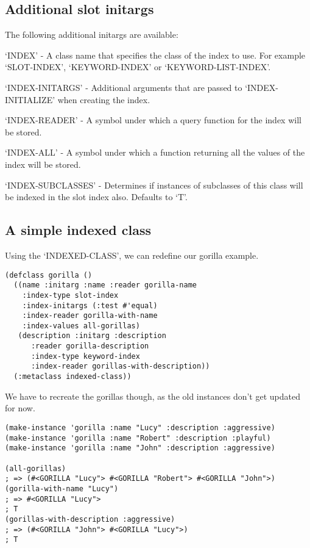 \subsection{ Additional slot initargs}

The following additional initargs are available:

`INDEX' - A class name that specifies the class of the index to
use. For example `SLOT-INDEX', `KEYWORD-INDEX' or
`KEYWORD-LIST-INDEX'.

`INDEX-INITARGS' - Additional arguments that are passed to
`INDEX-INITIALIZE' when creating the index.

`INDEX-READER' - A symbol under which a query function for the
index will be stored.

`INDEX-ALL' - A symbol under which a function returning all the
values of the index will be stored.

`INDEX-SUBCLASSES' - Determines if instances of subclasses of this
class will be indexed in the slot index also. Defaults to `T'.



\subsection{ A simple indexed class}

Using the `INDEXED-CLASS', we can redefine our gorilla example.

\begin{Verbatim}[fontsize=\small,frame=leftline,framerule=0.9mm,rulecolor=\color{gray},framesep=5.1mm,xleftmargin=5mm,fontfamily=cmtt]
(defclass gorilla ()
  ((name :initarg :name :reader gorilla-name
    :index-type slot-index
    :index-initargs (:test #'equal)
    :index-reader gorilla-with-name
    :index-values all-gorillas)
   (description :initarg :description
      :reader gorilla-description
      :index-type keyword-index
      :index-reader gorillas-with-description))
  (:metaclass indexed-class))
\end{Verbatim}
We have to recreate the gorillas though, as the old instances
don't get updated for now.

\begin{Verbatim}[fontsize=\small,frame=leftline,framerule=0.9mm,rulecolor=\color{gray},framesep=5.1mm,xleftmargin=5mm,fontfamily=cmtt]
(make-instance 'gorilla :name "Lucy" :description :aggressive)
(make-instance 'gorilla :name "Robert" :description :playful)
(make-instance 'gorilla :name "John" :description :aggressive)

(all-gorillas)
; => (#<GORILLA "Lucy"> #<GORILLA "Robert"> #<GORILLA "John">)
(gorilla-with-name "Lucy")
; => #<GORILLA "Lucy">
; T
(gorillas-with-description :aggressive)
; => (#<GORILLA "John"> #<GORILLA "Lucy">)
; T
\end{Verbatim}


